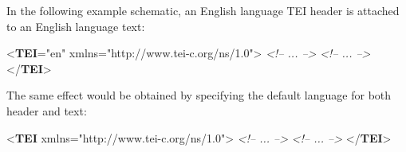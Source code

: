 In the following example schematic, an English language TEI header is attached to an English language text: \par\bgroup{}\exampleFont \begin{shaded}\noindent\mbox{}{<\textbf{TEI}\hspace*{1em}{xml:lang}="{en}" xmlns="http://www.tei-c.org/ns/1.0">}\mbox{}\newline 
{}\mbox{}\newline 
\textit{<!-- ... -->}\mbox{}\newline 
{}\mbox{}\newline 
{}\mbox{}\newline 
\textit{<!-- ... -->}\mbox{}\newline 
{}\mbox{}\newline 
{</\textbf{TEI}>}\end{shaded}\egroup\par \par
The same effect would be obtained by specifying the default language for both header and text: \par\bgroup{}\exampleFont \begin{shaded}\noindent\mbox{}{<\textbf{TEI} xmlns="http://www.tei-c.org/ns/1.0">}\mbox{}\newline 
{}\mbox{}\newline 
\textit{<!-- ... -->}\mbox{}\newline 
{}\mbox{}\newline 
{}\mbox{}\newline 
\textit{<!-- ... -->}\mbox{}\newline 
{}\mbox{}\newline 
{</\textbf{TEI}>}\end{shaded}\egroup\par \par
